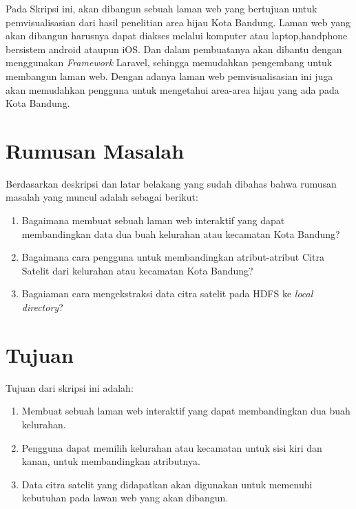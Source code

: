 \documentclass[a4paper,twoside]{article}
\begin{document}
Pada Skripsi ini, akan dibangun sebuah laman web yang bertujuan untuk pemvisualisasian dari hasil penelitian area hijau Kota Bandung. Laman web yang akan dibangun harusnya dapat diakses melalui komputer atau laptop,handphone bersistem android ataupun iOS. Dan dalam pembuatanya akan dibantu dengan menggunakan \emph{Framework} Laravel, sehingga memudahkan pengembang untuk membangun laman web. Dengan adanya laman web pemvisualisasian ini juga akan memudahkan pengguna untuk mengetahui area-area hijau yang ada pada Kota Bandung.

\section{Rumusan Masalah}
Berdasarkan deskripsi dan latar belakang yang sudah dibahas bahwa rumusan masalah yang muncul adalah sebagai berikut:

\begin{enumerate}
	\item Bagaimana membuat sebuah laman web interaktif yang dapat membandingkan data dua buah kelurahan atau kecamatan Kota Bandung?
	\item Bagaimana cara pengguna untuk membandingkan atribut-atribut Citra Satelit dari kelurahan atau kecamatan Kota Bandung?
	\item Bagaiaman cara mengekstraksi data citra satelit pada HDFS ke \textit{local directory}?	
\end{enumerate}

\section{Tujuan}
Tujuan dari skripsi ini adalah:
\begin{enumerate}
	\item Membuat sebuah laman web interaktif yang dapat membandingkan dua buah kelurahan.
	\item Pengguna dapat memilih kelurahan atau kecamatan untuk sisi kiri dan kanan, untuk membandingkan atributnya.
	\item Data citra satelit yang didapatkan akan digunakan untuk memenuhi kebutuhan pada lawan web yang akan dibangun.
\end{enumerate}
\end{document}

